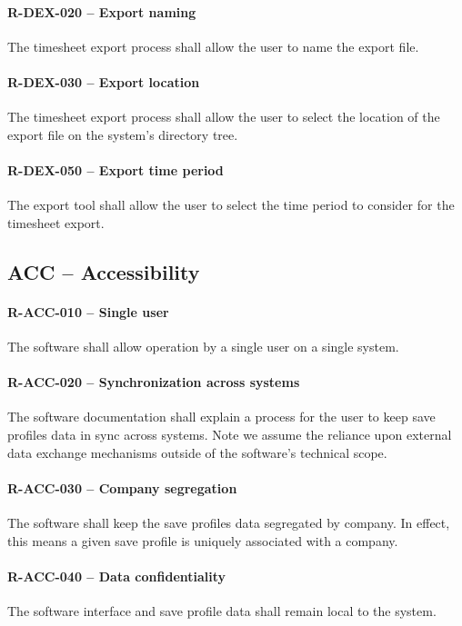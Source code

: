 \paragraph{R-DEX-020 -- Export naming}
The timesheet export process shall allow the user to name the export file.

\paragraph{R-DEX-030 -- Export location}
The timesheet export process shall allow the user to select the location
of the export file on the system's directory tree.

\paragraph{R-DEX-050 -- Export time period}
The export tool shall allow the user to select the time period to consider
for the timesheet export.

\subsection{ACC -- Accessibility}
\paragraph{R-ACC-010 -- Single user}
The software shall allow operation by a single user on a single system.

\paragraph{R-ACC-020 -- Synchronization across systems}
The software documentation shall explain a process for the user to keep save
profiles data in sync across systems. Note we assume the reliance upon external
data exchange mechanisms outside of the software's technical scope.

\paragraph{R-ACC-030 -- Company segregation}
The software shall keep the save profiles data segregated by company.
In effect, this means a given save profile is uniquely associated with a
company.

\paragraph{R-ACC-040 -- Data confidentiality}
The software interface and save profile data shall remain local to the system.


